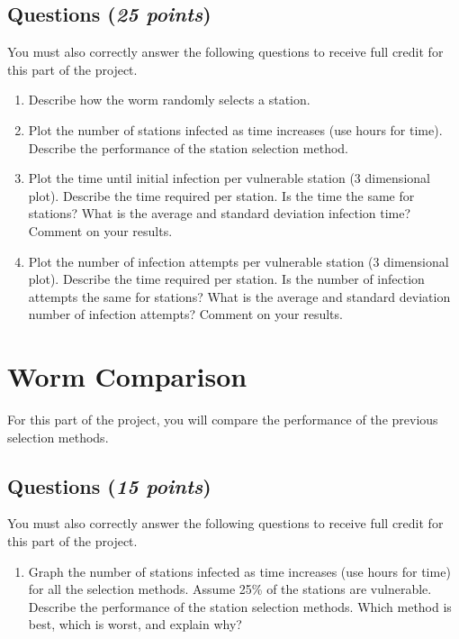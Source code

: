 \documentclass[10pt]{article}
\newcommand{\Section}[1]{
\noindent
\hrulefill
\vspace{-0.15in}
\section{#1}
}
\newcommand{\Questions}[1]{
\subsection*{Questions {\rm \normalsize (\textsf{\textit{#1 points}})}}
}
\begin{document}
\Questions{25}
You must also correctly answer the following questions to receive
full credit for this part of the project.
\begin{enumerate}
  \item Describe how the worm randomly selects a station.

  \item Plot the number of stations infected as time increases
(use hours for time). Describe the performance of the station
selection method.

  \item Plot the time until initial infection per vulnerable station
(3 dimensional plot). Describe the time required per station. Is
the time the same for stations? What is the average and standard
deviation infection time? Comment on your results.

  \item Plot the number of infection attempts per vulnerable
station (3 dimensional plot). Describe the time required per
station. Is the number of infection attempts the same for
stations? What is the average and standard deviation number of
infection attempts? Comment on your results.

\end{enumerate}


\Section{Worm Comparison}

For this part of the project, you will compare the performance of
the previous selection methods.

\Questions{15}
You must also correctly answer the following questions to receive
full credit for this part of the project.
\begin{enumerate}
  \item Graph the number of stations infected as time increases
(use hours for time) for all the selection methods. Assume 25\% of
the stations are vulnerable. Describe the performance of the
station selection methods.  Which method is best, which is worst,
and explain why?


\end{enumerate}
\end{document}
